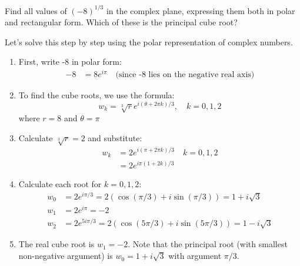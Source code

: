 \exampleline
\begin{example}
Find all values of $(-8)^{1/3}$ in the complex plane, expressing them both in polar and rectangular form. Which of these is the principal cube root?

\begin{solution}
Let's solve this step by step using the polar representation of complex numbers.

\begin{enumerate}
\item First, write -8 in polar form:
  \begin{align*}
  -8 &= 8e^{i\pi} \quad \text{(since -8 lies on the negative real axis)}
  \end{align*}

\item To find the cube roots, we use the formula:
  \[
  w_k = \sqrt[3]{r}e^{i(\theta + 2\pi k)/3}, \quad k = 0,1,2
  \]
  where $r = 8$ and $\theta = \pi$

\item Calculate $\sqrt[3]{r} = 2$ and substitute:
  \begin{align*}
  w_k &= 2e^{i(\pi + 2\pi k)/3} \quad k = 0,1,2 \\
  &= 2e^{i\pi(1 + 2k)/3}
  \end{align*}

\item Calculate each root for $k = 0,1,2$:
  \begin{align*}
  w_0 &= 2e^{i\pi/3} = 2(\cos(\pi/3) + i\sin(\pi/3)) = 1 + i\sqrt{3} \\
  w_1 &= 2e^{i\pi} = -2 \\
  w_2 &= 2e^{5i\pi/3} = 2(\cos(5\pi/3) + i\sin(5\pi/3)) = 1 - i\sqrt{3}
  \end{align*}

\item The real cube root is $w_1 = -2$. Note that the principal root (with smallest non-negative argument) is $w_0 = 1 + i\sqrt{3}$ with argument $\pi/3$.
\end{enumerate}

\begin{figure}[H]
\centering
{}
\end{figure}
\end{solution}
\end{example}
